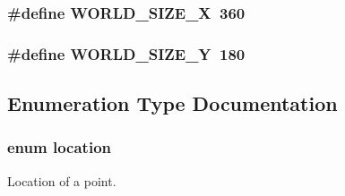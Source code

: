 \hypertarget{a00016_a0b8180d45b4f486b0376164e8d4236d4_a0b8180d45b4f486b0376164e8d4236d4}{
\subsubsection[{\-W\-O\-R\-L\-D\-\_\-\-S\-I\-Z\-E\-\_\-\-X}]{\setlength{\rightskip}{0pt plus 5cm}\#define {\bf \-W\-O\-R\-L\-D\-\_\-\-S\-I\-Z\-E\-\_\-\-X}~360}}\label{d7/d7a/a00016_a0b8180d45b4f486b0376164e8d4236d4_a0b8180d45b4f486b0376164e8d4236d4}
\hypertarget{a00016_ace6bb03745896c34e3d7d2c6ab92cb3b_ace6bb03745896c34e3d7d2c6ab92cb3b}{
\subsubsection[{\-W\-O\-R\-L\-D\-\_\-\-S\-I\-Z\-E\-\_\-\-Y}]{\setlength{\rightskip}{0pt plus 5cm}\#define {\bf \-W\-O\-R\-L\-D\-\_\-\-S\-I\-Z\-E\-\_\-\-Y}~180}}\label{d7/d7a/a00016_ace6bb03745896c34e3d7d2c6ab92cb3b_ace6bb03745896c34e3d7d2c6ab92cb3b}


\subsection{\-Enumeration \-Type \-Documentation}
\hypertarget{a00016_a5f269c22e6d9d32b0b0ad7e6166854df_a5f269c22e6d9d32b0b0ad7e6166854df}{
\subsubsection[{location}]{\setlength{\rightskip}{0pt plus 5cm}enum {\bf location}}}\label{d7/d7a/a00016_a5f269c22e6d9d32b0b0ad7e6166854df_a5f269c22e6d9d32b0b0ad7e6166854df}


\-Location of a point. 

